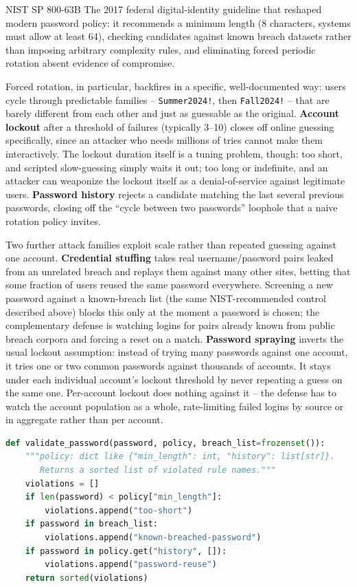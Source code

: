 \begin{definition}{NIST SP 800-63B}
The 2017 federal digital-identity guideline that reshaped modern password policy: it recommends a
minimum length (8 characters, systems must allow at least 64), checking candidates against known
breach datasets rather than imposing arbitrary complexity rules, and eliminating forced periodic
rotation absent evidence of compromise.
\end{definition}

Forced rotation, in particular, backfires in a specific, well-documented way: users cycle through
predictable families -- \texttt{Summer2024!}, then \texttt{Fall2024!} -- that are barely different
from each other and just as guessable as the original. \textbf{Account lockout} after a threshold
of failures (typically 3--10) closes off online guessing specifically, since an attacker who needs
millions of tries cannot make them interactively. The lockout duration itself is a tuning problem,
though: too short, and scripted slow-guessing simply waits it out; too long or indefinite, and an
attacker can weaponize the lockout itself as a denial-of-service against legitimate users.
\textbf{Password history} rejects a candidate matching the last several previous passwords,
closing off the ``cycle between two passwords'' loophole that a naive rotation policy invites.

Two further attack families exploit scale rather than repeated guessing against one account.
\textbf{Credential stuffing} takes real username/password pairs leaked from an unrelated breach and
replays them against many other sites, betting that some fraction of users reused the same password
everywhere. Screening a new password against a known-breach list (the same NIST-recommended control
described above) blocks this only at the moment a password is chosen; the complementary defense is
watching logins for pairs already known from public breach corpora and forcing a reset on a match.
\textbf{Password spraying} inverts the usual lockout assumption: instead of trying many passwords
against one account, it tries one or two common passwords against thousands of accounts. It stays
under each individual account's lockout threshold by never repeating a guess on the same one.
Per-account lockout does nothing against it -- the defense has to watch the account population as a
whole, rate-limiting failed logins by source or in aggregate rather than per account.

\begin{lstlisting}[language=Python, caption={Validating a candidate password against a policy}]
def validate_password(password, policy, breach_list=frozenset()):
    """policy: dict like {"min_length": int, "history": list[str]}.
       Returns a sorted list of violated rule names."""
    violations = []
    if len(password) < policy["min_length"]:
        violations.append("too-short")
    if password in breach_list:
        violations.append("known-breached-password")
    if password in policy.get("history", []):
        violations.append("password-reuse")
    return sorted(violations)
\end{lstlisting}

